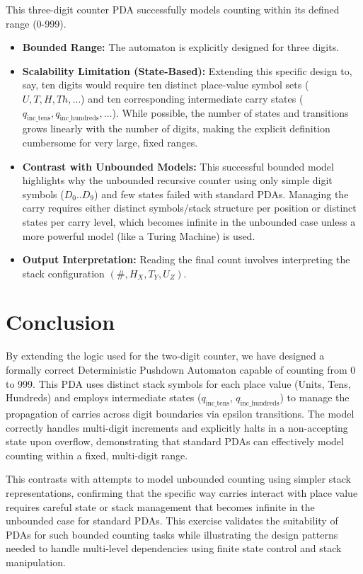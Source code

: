 \documentclass[11pt]{article}
\begin{document}
This three-digit counter PDA successfully models counting within its defined range (0-999).
\begin{itemize}
    \item \textbf{Bounded Range:} The automaton is explicitly designed for three digits.
    \item \textbf{Scalability Limitation (State-Based):} Extending this specific design to, say, ten digits would require ten distinct place-value symbol sets ($U, T, H, Th, \dots$) and ten corresponding intermediate carry states ($q_{\text{inc\_tens}}, q_{\text{inc\_hundreds}}, \dots$). While possible, the number of states and transitions grows linearly with the number of digits, making the explicit definition cumbersome for very large, fixed ranges.
    \item \textbf{Contrast with Unbounded Models:} This successful bounded model highlights why the unbounded recursive counter using only simple digit symbols ($D_0..D_9$) and few states failed with standard PDAs. Managing the carry requires either distinct symbols/stack structure per position or distinct states per carry level, which becomes infinite in the unbounded case unless a more powerful model (like a Turing Machine) is used.
    \item \textbf{Output Interpretation:} Reading the final count involves interpreting the stack configuration $(\#, H_X, T_Y, U_Z)$.
\end{itemize}

\section{Conclusion} \label{sec:conclusion_3digit}

By extending the logic used for the two-digit counter, we have designed a formally correct Deterministic Pushdown Automaton capable of counting from 0 to 999. This PDA uses distinct stack symbols for each place value (Units, Tens, Hundreds) and employs intermediate states ($q_{\text{inc\_tens}}$, $q_{\text{inc\_hundreds}}$) to manage the propagation of carries across digit boundaries via epsilon transitions. The model correctly handles multi-digit increments and explicitly halts in a non-accepting state upon overflow, demonstrating that standard PDAs can effectively model counting within a fixed, multi-digit range.

This contrasts with attempts to model unbounded counting using simpler stack representations, confirming that the specific way carries interact with place value requires careful state or stack management that becomes infinite in the unbounded case for standard PDAs. This exercise validates the suitability of PDAs for such bounded counting tasks while illustrating the design patterns needed to handle multi-level dependencies using finite state control and stack manipulation.
\end{document}
